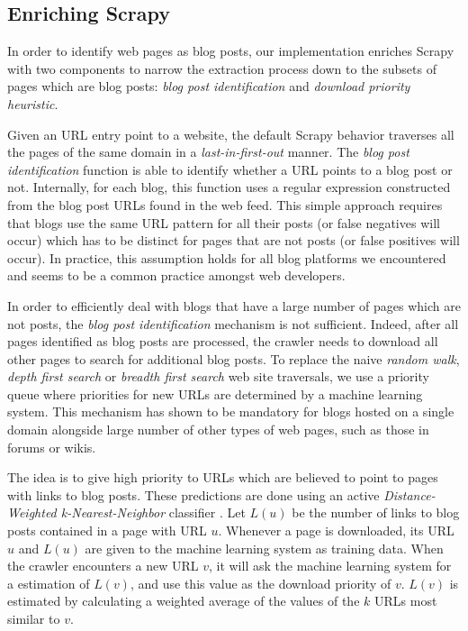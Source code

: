 \subsection{Enriching Scrapy}\label{enrichingscrapy}
In order to identify web pages as blog posts, our implementation enriches Scrapy with two components to narrow the extraction process down to the subsets of pages which are blog posts: \emph{blog post identification} and \emph{download priority heuristic}.

Given an URL entry point to a website, the default Scrapy behavior traverses all the pages of the same domain in a \emph{last-in-first-out} manner. The \emph{blog post identification} function is able to identify whether a URL points to a blog post or not. Internally, for each blog, this function uses a regular expression constructed from the blog post URLs found in the web feed. This simple approach requires that blogs use the same URL pattern for all their posts (or false negatives will occur) which has to be distinct for pages that are not posts (or false positives will occur). In practice, this assumption holds for all blog platforms we encountered and seems to be a common practice amongst web developers.

In order to efficiently deal with blogs that have a large number of pages which are not posts, the \emph{blog post identification} mechanism is not sufficient. Indeed, after all pages identified as blog posts are processed, the crawler needs to download all other pages to search for additional blog posts. To replace the naive \emph{random walk}, \emph{depth first search} or \emph{breadth first search} web site traversals, we use a priority queue where priorities for new URLs are determined by a machine learning system. This mechanism has shown to be mandatory for blogs hosted on a single domain alongside large number of other types of web pages, such as those in forums or wikis.

The idea is to give high priority to URLs which are believed to point to pages with links to blog posts. These predictions are done using an active \emph{Distance-Weighted k-Nearest-Neighbor} classifier \cite{dudani1976}. Let $L(u)$ be the number of links to blog posts contained in a page with URL $u$. Whenever a page is downloaded, its URL $u$ and $L(u)$ are given to the machine learning system as training data. When the crawler encounters a new URL $v$, it will ask the machine learning system for a estimation of $L(v)$, and use this value as the download priority of $v$. $L(v)$ is estimated by calculating a weighted average of the values of the $k$ URLs most similar to $v$.

